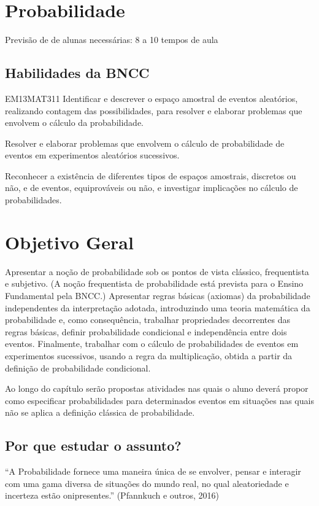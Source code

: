 \begin{apresentacao}\raggedcolumns
\section{Probabilidade}
Previsão de de alunas necessárias: 8 a 10 tempos de aula\

\subsection{Habilidades da BNCC}
\begin{habilities}{EM13MAT311}
Identificar e descrever o espaço amostral de eventos aleatórios, realizando contagem das possibilidades, para resolver e elaborar problemas que envolvem o cálculo da probabilidade.

Resolver e elaborar problemas que envolvem o cálculo de probabilidade de eventos em experimentos aleatórios sucessivos.

Reconhecer a existência de diferentes tipos de espaços amostrais, discretos ou não, e de eventos, equiprováveis ou não, e investigar implicações no cálculo de probabilidades.
\end{habilities}

\section{Objetivo Geral}
Apresentar a noção de probabilidade sob os pontos de vista clássico, frequentista e subjetivo. (A noção frequentista de probabilidade está prevista para o Ensino Fundamental pela BNCC.) Apresentar regras básicas (axiomas) da probabilidade independentes da interpretação adotada, introduzindo uma teoria matemática da probabilidade e, como consequência, trabalhar propriedades decorrentes das regras básicas, definir probabilidade condicional e independência entre dois eventos. Finalmente, trabalhar com o cálculo de probabilidades de eventos em experimentos sucessivos, usando a regra da multiplicação, obtida a partir da definição de probabilidade condicional.

Ao longo do capítulo serão propostas atividades nas quais o aluno deverá propor como especificar probabilidades para determinados eventos em situações nas quais não se aplica a definição clássica de probabilidade.

\subsection{Por que estudar o assunto?}
“A Probabilidade fornece uma maneira única de se envolver, pensar e interagir com uma gama diversa de situações do mundo real, no qual aleatoriedade e incerteza estão onipresentes.”{} (Pfannkuch e outros, 2016)


\end{apresentacao}
